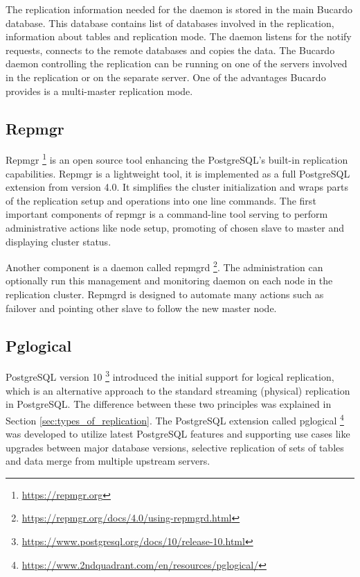\documentclass[
  digital, %
  twoside, %
  table,   %
  lof,     %
  lot,     %
]{fithesis3}
\begin{document}
The replication information needed for the daemon is stored in the main Bucardo database. This database contains list of databases involved in the replication, information about tables and replication mode. The daemon listens for the notify requests, connects to the remote databases and copies the data. The Bucardo daemon controlling the replication can be running on one of the servers involved in the replication or on the separate server. One of the advantages Bucardo provides is a multi-master replication mode.

\subsection{Repmgr} \label{sec:repmgr}
Repmgr \footnote{\url{https://repmgr.org}} is an open source tool enhancing the PostgreSQL's built-in replication capabilities. Repmgr is a lightweight tool, it is implemented as a full PostgreSQL extension from version 4.0. It simplifies the cluster initialization and wraps parts of the replication setup and operations into one line commands.
The first important components of repmgr is a command-line tool serving to perform administrative actions like node setup, promoting of chosen slave to master and displaying cluster status.

Another component is a daemon called repmgrd \footnote{\url{https://repmgr.org/docs/4.0/using-repmgrd.html}}. The administration can optionally run this management and monitoring daemon on each node in the replication cluster. Repmgrd is designed to automate many actions such as failover and pointing other slave to follow the new master node.

\subsection{Pglogical}
PostgreSQL version 10 \footnote{\url{https://www.postgresql.org/docs/10/release-10.html}} introduced the initial support for logical replication, which is an alternative approach to the standard streaming (physical) replication in PostgreSQL. The difference between these two principles was explained in Section \ref{sec:types_of_replication}. The PostgreSQL extension called pglogical \footnote{\url{https://www.2ndquadrant.com/en/resources/pglogical/}} was developed to utilize latest PostgreSQL features and supporting use cases like upgrades between major database versions, selective replication of sets of tables and data merge from multiple upstream servers.
\end{document}
